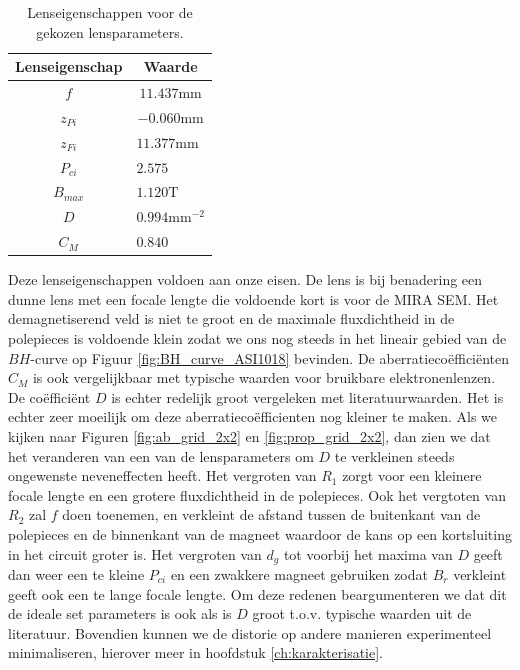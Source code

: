 \documentclass[we,twoside,openright,a4paper,11pt]{uantwerpenbamathesis}
\begin{document}
\begin{table}[H]
\centering
\begin{tabular}{@{}cl@{}}
\toprule
Lenseigenschap                     & \multicolumn{1}{c}{Waarde}  \\ \midrule
\multicolumn{1}{|c|}{$f$}        & \multicolumn{1}{c|}{$11.437\mathrm{mm}$}  \\ \midrule
\multicolumn{1}{|c|}{$z_{Pi}$}        & \multicolumn{1}{c|}{$-0.060\mathrm{mm}$} \\ \midrule
\multicolumn{1}{|c|}{$z_{Fi}$}        & \multicolumn{1}{l|}{$11.377\mathrm{mm}$}  \\ \midrule
\multicolumn{1}{|c|}{$P_{ci}$} & \multicolumn{1}{l|}{$2.575$}  \\ \midrule
\multicolumn{1}{|c|}{$B_{max}$} & \multicolumn{1}{l|}{$1.120\mathrm{T}$}    \\ \midrule
\multicolumn{1}{|c|}{$D$}        & \multicolumn{1}{l|}{$0.994\mathrm{mm}^{-2}$}    \\ \midrule
\multicolumn{1}{|c|}{$C_M$}        & \multicolumn{1}{l|}{$0.840$} \\ \midrule
\end{tabular}
\caption{Lenseigenschappen voor de gekozen lensparameters.}\label{tab:lens_properties}
\end{table}

Deze lenseigenschappen voldoen aan onze eisen. De lens is bij benadering een dunne lens met een focale lengte die voldoende kort is voor de MIRA SEM. Het demagnetiserend veld is niet te groot en de maximale fluxdichtheid in de polepieces is voldoende klein zodat we ons nog steeds in het lineair gebied van de $BH$-curve op Figuur \ref{fig:BH_curve_ASI1018} bevinden. De aberratiecoëfficiënten $C_M$ is ook vergelijkbaar met typische waarden voor bruikbare elektronenlenzen. De coëfficiënt $D$ is echter redelijk groot vergeleken met literatuurwaarden. Het is echter zeer moeilijk om deze aberratiecoëfficienten nog kleiner te maken. Als we kijken naar Figuren \ref{fig:ab_grid_2x2} en \ref{fig:prop_grid_2x2}, dan zien we dat het veranderen van een van de lensparameters om $D$ te verkleinen steeds ongewenste neveneffecten heeft. Het vergroten van $R_1$ zorgt voor een kleinere focale lengte en een grotere fluxdichtheid in de polepieces. Ook het vergtoten van $R_2$ zal $f$ doen toenemen, en verkleint de afstand tussen de buitenkant van de polepieces en de binnenkant van de magneet waardoor de kans op een kortsluiting in het circuit groter is. Het vergroten van $d_g$ tot voorbij het maxima van $D$ geeft dan weer een te kleine $P_{ci}$ en een zwakkere magneet gebruiken zodat $B_r$ verkleint geeft ook een te lange focale lengte. Om deze redenen beargumenteren we dat dit de ideale set parameters is ook als is $D$ groot t.o.v. typische waarden uit de literatuur. Bovendien kunnen we de distorie op andere manieren experimenteel minimaliseren, hierover meer in hoofdstuk \ref{ch:karakterisatie}.\\
\end{document}
